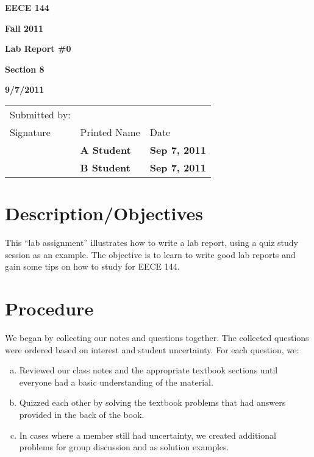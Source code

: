 \documentclass[12pt]{article}
\begin{document}

\centerline{\bf EECE 144}
\centerline{\bf Fall 2011}
\centerline{\bf}
\centerline{\bf Lab Report \#0}
\centerline{\bf Section 8}
\centerline{\bf 9/7/2011}

\begin{center}
\begin{tabularx}{\textwidth}[b]{X X l}
Submitted by: & & \\
Signature & Printed Name & Date \\
\hline
\multicolumn{1}{|X|}{} & \multicolumn{1}{|l|}{\bigstrut \bf A Student} & \multicolumn{1}{|l|}{\bf Sep 7, 2011} \\
\hline
\multicolumn{1}{|X|}{} & \multicolumn{1}{|l|}{\bigstrut \bf B Student} & \multicolumn{1}{|l|}{\bf Sep 7, 2011} \\
\hline
\end{tabularx}
\end{center}

\section{Description/Objectives}

This “lab assignment” illustrates how to write a lab report, using a quiz study
session as an example. The objective is to learn to write good lab reports and
gain some tips on how to study for EECE 144.

\section{Procedure}

We began by collecting our notes and questions together. The collected
questions were ordered based on interest and student uncertainty.
For each question, we:

\begin{enumerate}[a.]
\item Reviewed our class notes and the appropriate textbook sections until
everyone had a basic understanding of the material.
\item Quizzed each other by solving the textbook problems that had answers
provided in the back of the book.
\item In cases where a member still had uncertainty, we created additional
problems for group discussion and as solution examples.
\end{enumerate}
\end{document}
